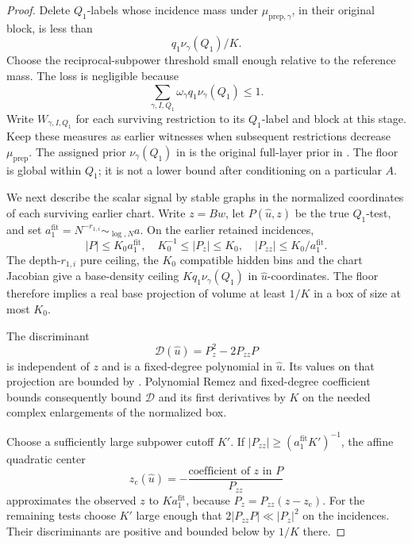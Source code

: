 \begin{proof}
Delete \(Q_1\)-labels whose incidence mass under
\(\mu_{\mathrm{prep},\gamma}\), in their original block, is less than
\begin{equation}
 \label{a08:Q1-witness-floor}
 q_1\nu_\gamma(Q_1)/K.
\end{equation}
Choose the reciprocal-subpower threshold small enough relative to
the reference mass.  The loss is negligible because
\[
 \sum_{\gamma,I,Q_1}
   \omega_\gamma q_1\nu_\gamma(Q_1)\le1.
\]
Write \(W_{\gamma,I,Q_1}\) for each surviving restriction to its
\(Q_1\)-label and block at this stage.  Keep these measures as
earlier witnesses when subsequent restrictions decrease
\(\mu_{\mathrm{prep}}\).  The assigned prior
\(\nu_\gamma(Q_1)\) in
 is the original full-layer prior in
.  The floor is global within \(Q_1\);
it is not a lower bound after conditioning on a particular \(A\).

We next describe the scalar signal by stable graphs in the normalized
coordinates of each surviving earlier chart.
Write \(z=Bw\), let \(P(\widehat u,z)\) be the true \(Q_1\)-test,
and set \(a_1^{\mathrm{fit}}=N^{-r_{1,i}}\sim_{\log,N}a\).
On the earlier retained incidences,
\begin{equation}
 \label{a08:local-test-bounds}
 |P|\le K_0a_1^{\mathrm{fit}},\quad
 K_0^{-1}\le |P_z|\le K_0,\quad
 |P_{zz}|\le K_0/a_1^{\mathrm{fit}}.
\end{equation}
The depth-\(r_{1,i}\) pure ceiling, the \(K_0\) compatible hidden
bins and the chart Jacobian give a base-density ceiling
\(Kq_1\nu_\gamma(Q_1)\) in \(\widehat u\)-coordinates.
The floor  therefore implies a real base
projection of volume at least \(1/K\) in a box of size at most \(K_0\).

The discriminant
\[
 \mathcal D(\widehat u)=P_z^2-2P_{zz}P
\]
is independent of \(z\) and is a fixed-degree polynomial in
\(\widehat u\).  Its values on that projection are bounded by
.  Polynomial Remez and fixed-degree
coefficient bounds consequently bound \(\mathcal D\) and its first
derivatives by \(K\) on the needed complex enlargements of the
normalized box.

Choose a sufficiently large subpower cutoff \(K'\).
If \(|P_{zz}|\ge (a_1^{\mathrm{fit}}K')^{-1}\), the affine
quadratic center
\[
 z_{\mathrm c}(\widehat u)
   =-\frac{\text{coefficient of \(z\) in \(P\)}}{P_{zz}}
\]
approximates the observed \(z\) to \(Ka_1^{\mathrm{fit}}\), because
\(P_z=P_{zz}(z-z_{\mathrm c})\).
For the remaining tests choose \(K'\) large enough that
\(2|P_{zz}P|\ll |P_z|^2\) on the incidences.  Their discriminants
are positive and bounded below by \(1/K\) there.


\end{proof}
